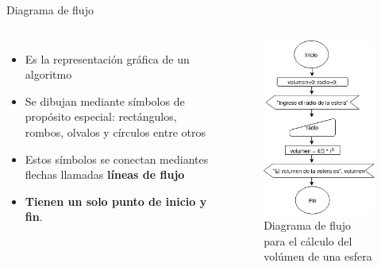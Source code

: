 \documentclass[xcolor=pdftex,table,11pt]{beamer}
\begin{document}
\begin{frame}{Diagrama de flujo}
\begin{columns}
 \begin{itemize}
   
     	\item<1-> Es la representación gráfica de un algoritmo
        \item<2-> Se dibujan mediante símbolos de propósito especial: rectángulos, rombos, olvalos y círculos entre otros
 		\item<3-> Estos símbolos se conectan mediantes flechas llamadas \textbf{líneas de flujo}
 		\item<4-> \textbf{Tienen un solo punto de inicio y fin}.
   \end{itemize}
 \begin{figure}
\includegraphics[scale=0.4]{img/exported/volumen_esfera.png}
\caption{Diagrama de flujo para el cálculo del volúmen de una esfera}
\end{figure}
\end{columns}
\end{frame}
\end{document}

